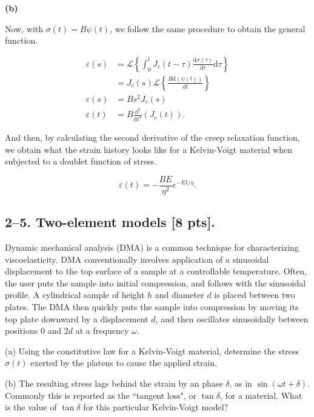 \textbf{(b)}

Now, with $\sigma(t) = B\psi(t)$, we follow the same procedure to obtain the general function.

\begin{align*}
    \varepsilon (s) &= \mathcal{L} \left\{ \int_0^t J_c (t-\tau) \frac{\textrm{d} \sigma (\tau)}{\textrm{d} \tau} \textrm{d}\tau \right\}\\
    &= J_c (s) \mathcal{L} \left \{ \frac{B \mathrm{d} (\psi (t))}{\mathrm{d}t} \right \}\\
    \varepsilon (s) &= B s^2 J_c (s)\\
    \varepsilon (t) &= B \frac{\mathrm{d}^2}{\mathrm{d}t^2} (J_c(t)).
\end{align*}

And then, by calculating the second derivative of the creep relaxation function, we obtain what the strain history looks like for a Kelvin-Voigt material when subjected to a doublet function of stress.

\begin{equation*}
    \varepsilon (t) = -\frac{BE}{\eta ^2} e^{-Et/\eta}.
\end{equation*}

\bigskip
\newpage
\subsection*{2--5. \textbf{Two-element models} [8 pts].}

Dynamic mechanical analysis (DMA) is a common technique for characterizing viscoelasticity. 
DMA conventionally involves application of a sinusoidal displacement to the top surface of a sample at a controllable temperature. 
Often, the user puts the sample into initial compression, and follows with the sinusoidal profile. 
A cylindrical sample of height $h$ and diameter $d$ is placed between two plates.
The DMA then quickly puts the sample into compression by moving its top plate downward by a displacement $d$, and then oscillates sinusoidally between positions $0$ and $2d$ at a frequency $\omega$.

\medskip
(a) Using the constitutive law for a Kelvin-Voigt material, determine the stress $\sigma(t)$ exerted by the platens to cause the applied strain. 

\medskip
(b) The resulting stress lags behind the strain by an phase $\delta$, as in $\sin(\omega t + \delta)$. 
Commonly this is reported as the ``tangent loss", or $\tan\delta$, for a material. 
What is the value of $\tan\delta$ for this particular Kelvin-Voigt model?

